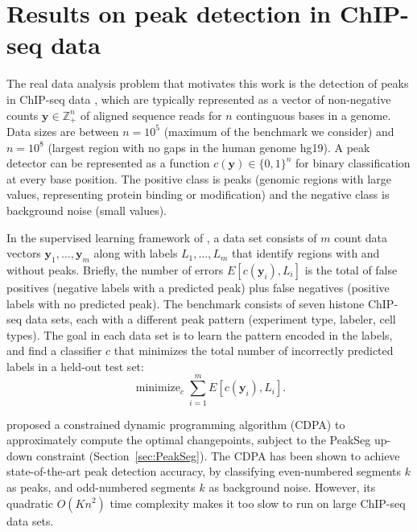\documentclass[aoas]{imsart}
\DeclareMathOperator*{\minimize}{minimize}
\newcommand{\ZZ}{\mathbb Z}
\begin{document}
\section{Results on peak detection in ChIP-seq data}
\label{sec:results-chip-seq}
\label{sec:results}


The real data analysis problem that motivates this work is the
detection of peaks in ChIP-seq data \citep{practical}, which are
typically represented as a vector of non-negative counts
$\mathbf y\in\ZZ_+^n$ of aligned sequence reads for $n$ continguous
bases in a genome. Data sizes are between $n=10^5$ (maximum of the
benchmark we consider) and $n=10^8$ (largest region with no gaps in
the human genome hg19). A peak detector can be represented
as a function $c(\mathbf y)\in\{0,1\}^n$ for binary classification at
every base position. The positive class is peaks (genomic regions with
large values, representing protein binding or modification) and the
negative class is background noise (small values).


In the supervised learning framework of \citet{HOCKING2016-chipseq}, a
data set consists of $m$ count data vectors
$\mathbf y_1,\dots,\mathbf y_m$ along with labels $L_1,\dots, L_m$
that identify regions with and without peaks. Briefly, the number of
errors $E[c(\mathbf y_i), L_i]$ is the total of false positives
(negative labels with a predicted peak) plus false negatives (positive
labels with no predicted peak). The benchmark consists of seven
histone ChIP-seq data sets, each with a different peak pattern
(experiment type, labeler, cell types). The goal in each data set is
to learn the pattern encoded in the labels, and find a classifier $c$
that minimizes the total number of incorrectly predicted labels in a
held-out test set:
\begin{equation}
  \label{eq:learn}
  \minimize_c
  \sum_{i=1}^m 
  E\left[
    c(\mathbf y_i), L_i
  \right].
\end{equation}

\citet{HOCKING-PeakSeg} proposed a constrained dynamic programming
algorithm (CDPA) to approximately compute the optimal changepoints,
subject to the PeakSeg up-down constraint
(Section~\ref{sec:PeakSeg}). The CDPA has been shown to achieve
state-of-the-art peak detection accuracy, by classifying even-numbered
segments $k$ as peaks, and odd-numbered segments $k$ as background
noise. However, its quadratic $O(Kn^2)$ time complexity makes it too
slow to run on large ChIP-seq data sets.
\end{document}
